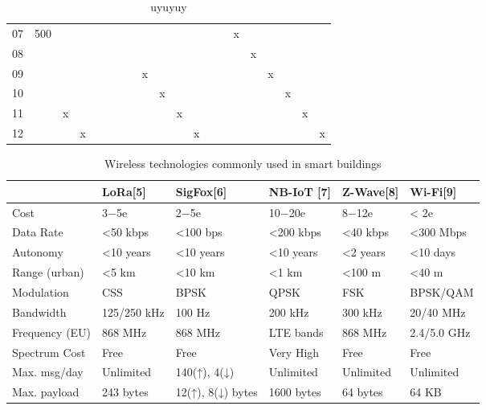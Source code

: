 \begin{table}[h!]
\begin{tabular}{|c|c|c|c|c|c|c|c|c|c|c|c|c|c|c|c|c|c|c|c|}
	07          & \multirow{6}{*}{500} &    &    &    &    &    &    &    &    &    &    &    &    & x  &    &    &    &    &   \\\cline{3-20}
	08          &                      &    &    &    &    &    &    &    &    &    &    &    &    &    & x  &    &    &    &   \\\cline{3-20}
	09          &                      &    &    &    &    &    &    & x  &    &    &    &    &    &    &    & x  &    &    &   \\\cline{3-20}
	10          &                      &    &    &    &    &    &    &    & x  &    &    &    &    &    &    &    & x  &    &   \\\cline{3-20}
	11          &                      & x  &    &    &    &    &    &    &    & x  &    &    &    &    &    &    &    & x  &   \\\cline{3-20}
	12          &                      &    & x  &    &    &    &    &    &    &    & x  &    &    &    &    &    &    &    & x \\\cline{1-20}
	\end{tabular}
\caption{\label{tab:uyuy} uyuyuy}
\end{table}


\begin{table}[h!]
\scriptsize
	\begin{tabulary}{\textwidth}{L|L|L|L|L|L}
	\              & LoRa[5]     & SigFox[6]         & NB-IoT [7] & Z-Wave[8] & Wi-Fi[9]   \\\hline
	Cost           & 3−5e        & 2−5e              & 10−20e     & 8−12e     & < 2e       \\\hline
	Data Rate      & <50 kbps    & <100 bps          & <200 kbps  & <40 kbps  & <300 Mbps  \\\hline
	Autonomy       & <10 years   & <10 years         & <10 years  & <2 years  & <10 days   \\\hline
	Range (urban)  & <5 km       & <10 km            & <1 km      & <100 m    & <40 m      \\\hline
	Modulation     & CSS         & BPSK              & QPSK       & FSK       & BPSK/QAM   \\\hline
	Bandwidth      & 125/250 kHz & 100 Hz            & 200 kHz    & 300 kHz   & 20/40 MHz  \\\hline
	Frequency (EU) & 868 MHz     & 868 MHz           & LTE bands  & 868 MHz   & 2.4/5.0 GHz\\\hline
	Spectrum Cost  & Free        & Free              & Very High  & Free      & Free       \\\hline
	Max. msg/day   & Unlimited   & 140(↑), 4(↓)      & Unlimited  & Unlimited & Unlimited  \\\hline
	Max. payload   & 243 bytes   & 12(↑), 8(↓) bytes & 1600 bytes & 64 bytes  & 64 KB      \\\hline
	\end{tabulary}
\caption{\label{tab:terdjfy} Wireless technologies commonly used in smart buildings \cite{lopes_design_2019}}
\end{table}


